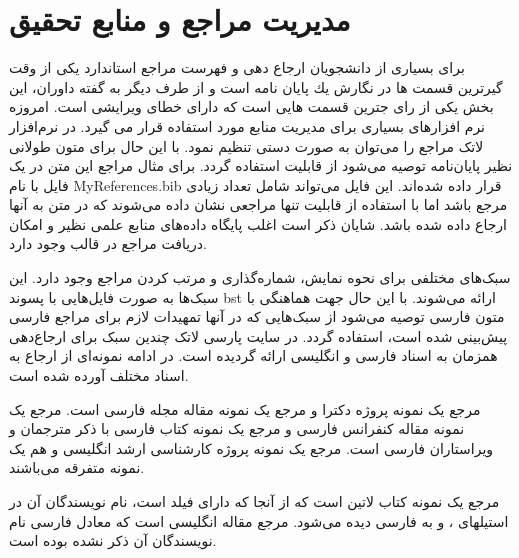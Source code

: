 \chapter{مدیریت مراجع و منابع تحقیق}
برای بسیاری از دانشجویان ارجاع دهی و فهرست مراجع استاندارد یكی از وقت گیرترین قسمت ها در نگارش یك پایان نامه
است و از طرف دیگر به گفته داوران، این بخش یكی از رای جترین قسمت هایی است كه دارای خطای ویرایشی است. امروزه
نرم افزارهای بسیاری برای مدیریت منابع مورد استفاده قرار می گیرد. در نرم‌افزار لاتک مراجع  را می‌توان به صورت دستی تنظیم نمود. با این حال برای متون طولانی نظیر پایان‌نامه توصیه می‌شود از قابلیت  استفاده گردد. برای مثال مراجع این متن در یک فایل با نام MyReferences.bib قرار داده شده‌اند. این فایل می‌تواند شامل تعداد زیادی مرجع باشد اما با استفاده از قابلیت  تنها مراجعی نشان داده می‌شوند که در متن به آنها ارجاع داده شده باشد. شایان ذکر است اغلب پایگاه داده‌های منابع علمی نظیر  و  امکان دریافت مراجع در قالب  وجود دارد.

سبک‌های مختلفی برای نحوه نمایش، شماره‌گذاری و مرتب کردن مراجع وجود دارد. این سبک‌ها به صورت فایل‌هایی با پسوند bst ارائه می‌شوند. با این حال جهت هماهنگی با متون فارسی توصیه می‌شود از سبک‌هایی که در آنها تمهیدات لازم برای مراجع فارسی پیش‌بینی شده است، استفاده گردد. در سایت پارسی لاتک چندین سبک برای ارجاع‌دهی همزمان به اسناد فارسی و انگلیسی ارائه گردیده است. در ادامه نمونه‌ای از ارجاع به اسناد مختلف آورده شده است. 

مرجع \cite{Omidali82phdThesis} یک نمونه پروژه دکترا و مرجع \cite{Vahedi87} یک نمونه مقاله مجله فارسی است.
مرجع \cite{Amintoosi87afzayesh}  یک نمونه  مقاله کنفرانس فارسی و
مرجع \cite{Pedram80osool} یک نمونه کتاب فارسی با ذکر مترجمان و ویراستاران فارسی است. مرجع \cite{Khalighi07MscThesis} یک نمونه پروژه کارشناسی ارشد انگلیسی و
\cite{Khalighi87xepersian} هم یک نمونه متفرقه  می‌باشند.

مرجع \cite{Gonzalez02book} یک نمونه کتاب لاتین است که از آنجا که دارای فیلد  است، نام نویسندگان آن در استیلهای ،  و  به فارسی دیده می‌شود. مرجع \cite{Baker02limits} مقاله انگلیسی است که معادل فارسی نام نویسندگان آن ذکر نشده بوده است.


